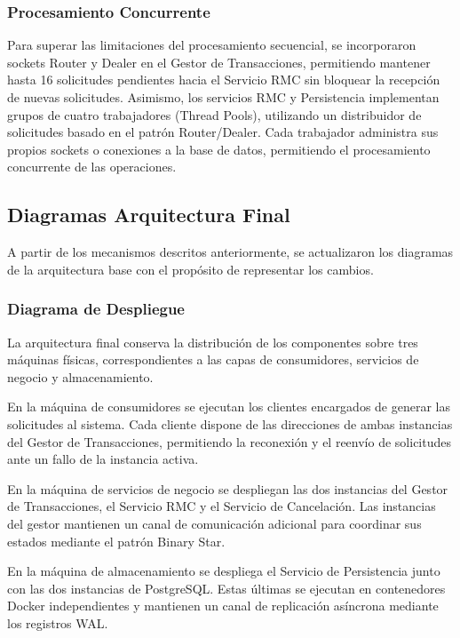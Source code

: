 \documentclass[conference]{IEEEtran}
\begin{document}
\subsubsection{Procesamiento Concurrente}

Para superar las limitaciones del procesamiento secuencial, se 
incorporaron sockets Router y Dealer en el Gestor de Transacciones, 
permitiendo mantener hasta 16 solicitudes pendientes hacia el 
Servicio RMC sin bloquear la recepción de nuevas solicitudes. 
Asimismo, los servicios RMC y Persistencia implementan grupos 
de cuatro trabajadores (Thread Pools), utilizando un distribuidor 
de solicitudes basado en el patrón Router/Dealer. Cada trabajador administra 
sus propios sockets o conexiones a la base de datos, permitiendo 
el procesamiento concurrente de las operaciones.

\subsection{Diagramas Arquitectura Final}

A partir de los mecanismos descritos anteriormente, se actualizaron 
los diagramas de la arquitectura base con el propósito de representar 
los cambios.

\subsubsection{Diagrama de Despliegue}

La arquitectura final conserva la distribución de los componentes 
sobre tres máquinas físicas, correspondientes a las capas de consumidores, 
servicios de negocio y almacenamiento.

En la máquina de consumidores se ejecutan los clientes encargados 
de generar las solicitudes al sistema. Cada cliente dispone de las 
direcciones de ambas instancias del Gestor de Transacciones, permitiendo 
la reconexión y el reenvío de solicitudes ante un fallo de la instancia 
activa.

En la máquina de servicios de negocio se despliegan las dos instancias 
del Gestor de Transacciones, el Servicio RMC y el Servicio de Cancelación. 
Las instancias del gestor mantienen un canal de comunicación adicional 
para coordinar sus estados mediante el patrón Binary Star.

En la máquina de almacenamiento se despliega el Servicio de Persistencia 
junto con las dos instancias de PostgreSQL. Estas últimas se ejecutan 
en contenedores Docker independientes y mantienen un canal de replicación 
asíncrona mediante los registros WAL.
\end{document}
